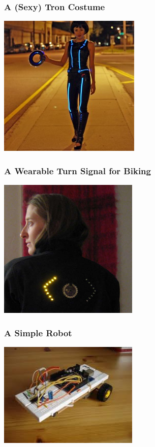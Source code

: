 \documentclass[yellow]{beamer}
\begin{document}
\begin{frame}
\frametitle{A (Sexy) Tron Costume}
\begin{center}
	\includegraphics[scale=0.75]{tron.jpg}
\end{center}
\end{frame}

\begin{frame}
\frametitle{A Wearable Turn Signal for Biking}
\begin{center}
	\includegraphics[width=0.5\textwidth]{bike.jpg}
\end{center}
\end{frame}

\begin{frame}
\frametitle{A Simple Robot}
\begin{center}
	\includegraphics[width=0.5\textwidth]{images-2.jpeg}
\end{center}
\end{frame}
\end{document}
